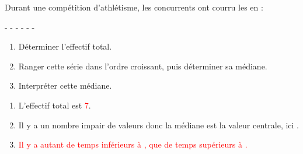 \begin{exercice*}
    Durant une compétition d'athlétisme, les concurrents ont courru les  en :

     -  -  -  -  -  - 
    \begin{enumerate}
        \item Déterminer l'effectif total.
        \item Ranger cette série dans l'ordre croissant, puis déterminer sa médiane.
        \item Interpréter cette médiane.
    \end{enumerate}
\end{exercice*}
\begin{corrige}
    \begin{enumerate}
        \item L'effectif total est \textcolor{red}{7}.
        \item Il y a un nombre impair de valeurs donc la médiane est la valeur centrale, ici \textcolor{red}{}.
        \item \textcolor{red}{Il y a autant de temps inférieurs à , que de temps supérieurs à .}
    \end{enumerate}
\end{corrige}

